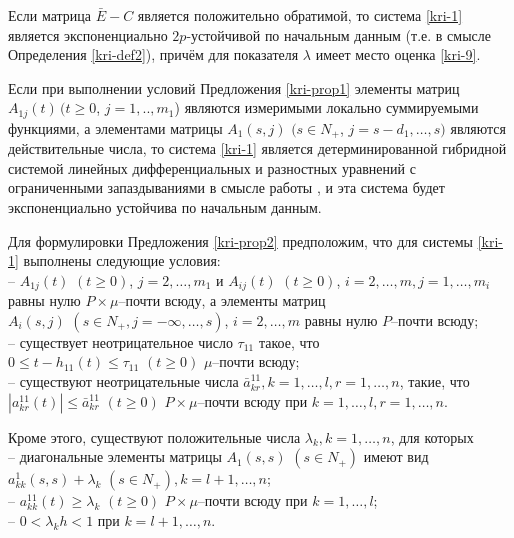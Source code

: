 \begin{proposition}\label{kri-prop1}
Если матрица $\bar E - C$ является
положительно обратимой, то система \eqref{kri-1} является экспоненциально
$2p$-устойчивой по начальным данным (т.е. в смысле Определения \ref{kri-def2}),
причём для показателя  $\lambda$ имеет место оценка \eqref{kri-9}.
\end{proposition}
\begin{remark}\label{kri-rem1}  Если при выполнении условий Предложения \ref{kri-prop1}
элементы матриц $A_{1j} (t) \, (t \geq 0$, $j = 1,..,m_1$) являются
измеримыми локально суммируемыми функциями, а элементами матрицы
$A_1(s,j)\,\, (s \in N_+$, $j=s-d_1, \dots, s)$ являются
действительные числа,  то система \eqref{kri-1} является детерминированной
гибридной системой линейных дифференциальных  и разностных уравнений
с ограниченными запаздываниями в смысле работы \cite{kri-5}, и эта
система будет экспоненциально устойчива по начальным данным.
\end{remark}

Для формулировки Предложения \ref{kri-prop2} предположим, что для системы \eqref{kri-1}
выполнены следующие условия:\\
\noindent
  -- $A_{1j}(t) \,\, (t \geq 0)$, $j = 2,\dots,m_1$ и $A_{ij}(t) \,\, (t
\geq 0)$, $i = 2,\dots,m, j = 1,\dots,m_i$ равны нулю $P\times
\mu$--почти всюду, а элементы матриц $A_i(s,j)\,\, (s \in N_+,
j=-\infty,\dots,s)$, $i=2,\dots,m$  равны нулю $P$--почти всюду;\\
  -- существует неотрицательное число $\tau_{11}$ такое, что $0 \leq
t- h_{11}(t) \leq \tau _{11} {\,} {\,} (t \geq 0)$ $\mu $--почти
всюду;\\
  -- существуют неотрицательные числа $\bar
a^{11}_{kr}, k =1,\dots,l, r = 1,\dots,n$,  такие, что
  $|a^{11}_{kr}(t)|\leq \bar a^{11}_{kr} \,\, (t\geq 0) $
$P\times\mu$--почти всюду при $k =1,\dots,l, r = 1,\dots,n$.

 Кроме этого, существуют положительные числа $\lambda _k, k = 1, \dots, n$, для которых\\
 \noindent
-- диагональные элементы матрицы $ A_1(s,s)$
$(s \in N_+)$ имеют вид $a_{kk}^{1}(s,s) + \lambda _k \,\, (s \in
N_+), k=l + 1, \dots, n$;\\
   -- $a^{11}_{kk}(t) \geq \lambda _k \,\, (t\geq 0)$
$P\times\mu$--почти всюду при $k = 1,\dots,l$;\\
   -- $0 < \lambda _kh < 1$ при $ k = l + 1, \dots, n$.

